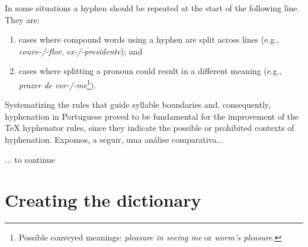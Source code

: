 \documentclass{article}
\begin{document}
In some situations a hyphen should be repeated at the start of the following
line. They are: 
\begin{enumerate}
\item cases where compound words using a hyphen are split across lines (e.g.,
    \emph{couve-/-flor}, \emph{ex-/-presidente}); and
\item cases where splitting a pronoun could result in a different meaning (e.g.,
    \emph{prazer de ver-/-me}\footnote{Possible conveyed meanings: 
    \emph{pleasure in seeing me} or \emph{worm's pleasure}.}). 
\end{enumerate}


Systematizing the rules that guide syllable boundaries and, consequently,
hyphenation in Portuguese proved to be fundamental for the improvement of the
\TeX{} hyphenator rules, since they indicate the possible or prohibited contexts
of hyphenation. Expomos, a seguir, uma análise comparativa...

... to continue
\vspace{10ex}



\section{Creating the dictionary}
\end{document}
